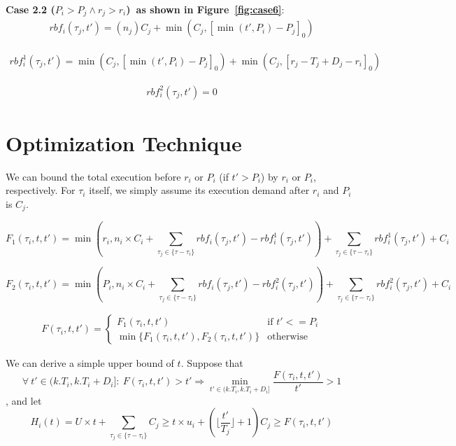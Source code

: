 \documentclass[12pt,conference,onecolumn]{IEEEtran}
\begin{document}
\textbf{Case 2.2 ($P_i>P_j\wedge r_j> r_i$)~as shown in  Figure~\ref{fig:case6}}: 
\begin{align*}
	rbf_i(\tau_j,t')=(n_j) C_j+\min\left(C_j,[\min(t',P_i)-P_j]_0\right)
\end{align*}


\begin{align*}
rbf_{i}^1(\tau_j,t')=\min\left(C_j,[\min(t',P_i)-P_j]_0\right)+\min(C_j,[r_j-T_j+D_j-r_i]_0)
\end{align*}

\begin{align*}
rbf_{i}^2(\tau_j,t')=0
\end{align*}





\section{Optimization Technique}
We can bound the total execution before $r_i$ or $P_i$ (if $t'>P_i$) by $r_i$ or $P_i$, respectively. For $\tau_i$ itself, we simply assume its execution demand after $r_i$ and $P_i$ is $C_j$.

\begin{equation}
F_1(\tau_i,t,t')=\min\left(r_i,n_i\times C_i+\sum_{\tau_j\in\{\tau-\tau_i\}}rbf_i(\tau_j,t')-rbf_{i}^1(\tau_j,t')\right)+\sum_{\tau_j\in\{\tau-\tau_i\}}rbf_{i}^1(\tau_j,t')+C_i
\end{equation}


\begin{equation}
F_2(\tau_i,t,t')=\min\left(P_i,n_i\times C_i+\sum_{\tau_j\in\{\tau-\tau_i\}}rbf_i(\tau_j,t')-rbf_{i}^2(\tau_j,t')\right)+\sum_{\tau_j\in\{\tau-\tau_i\}}rbf_{i}^2(\tau_j,t')+C_i
\end{equation}

\begin{equation}
\begin{split}
F(\tau_i,t,t')=
\begin{cases}
F_1(\tau_i,t,t')&\mbox{if } t'<=P_i\\
\min\{F_1(\tau_i,t,t'),F_2(\tau_i,t,t')\}&\mbox{otherwise}
	\end{cases}	
\end{split}
\end{equation}




We can derive a simple upper bound of $t$. Suppose that
\[
\forall~t'\in(k.T_i,k.T_i+D_i]:~F(\tau_i,t,t')>t'\Rightarrow\min_{t'\in(k.T_i,k.T_i+D_i]}\frac{F(\tau_i,t,t')}{t'}>1
\]
, and let
\[
H_i(t)=  U\times t+\sum_{\tau_j\in\{\tau-\tau_i\}}C_j\geq t\times u_i+(\lfloor \frac{t'}{T_j} \rfloor+1)C_j\geq F(\tau_i,t,t')
\]
\end{document}
